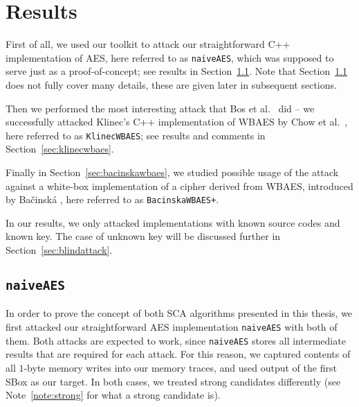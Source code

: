 \section{Results}
\label{sec:results}

First of all, we used our toolkit to attack our straightforward C++ implementation of AES, here referred to as {\tt naiveAES}, which was supposed to serve just as a proof-of-concept; see results in Section~\ref{sec:naiveaes}. Note that Section~\ref{sec:naiveaes} does not fully cover many details, these are given later in subsequent sections.

Then we performed the most interesting attack that Bos et al.\ \cite{bos2015differential} did -- we successfully attacked Klinec's C++ implementation \cite{klinec2013implementation} of WBAES by Chow et al.\ \cite{chow2002aes}, here referred to as {\tt KlinecWBAES}; see results and comments in Section~\ref{sec:klinecwbaes}.

Finally in Section~\ref{sec:bacinskawbaes}, we studied possible usage of the attack against a white-box implementation of a cipher derived from WBAES, introduced by Bačinská \cite{bacinska2015white}, here referred to as {\tt BacinskaWBAES+}.

\begin{note}
\label{note:expdes}
	In our results, we only attacked implementations with known source codes and known key. The case of unknown key will be discussed further in Section~\ref{sec:blindattack}.
\end{note}



\subsection{\tt naiveAES}
\label{sec:naiveaes}

In order to prove the concept of both SCA algorithms presented in this thesis, we first attacked our straightforward AES implementation {\tt naiveAES} with both of them. Both attacks are expected to work, since {\tt naiveAES} stores all intermediate results that are required for each attack. For this reason, we captured contents of all $1$-byte memory writes into our memory traces, and used output of the first SBox as our target. In both cases, we treated strong candidates differently (see Note~\ref{note:strong} for what a strong candidate is).

